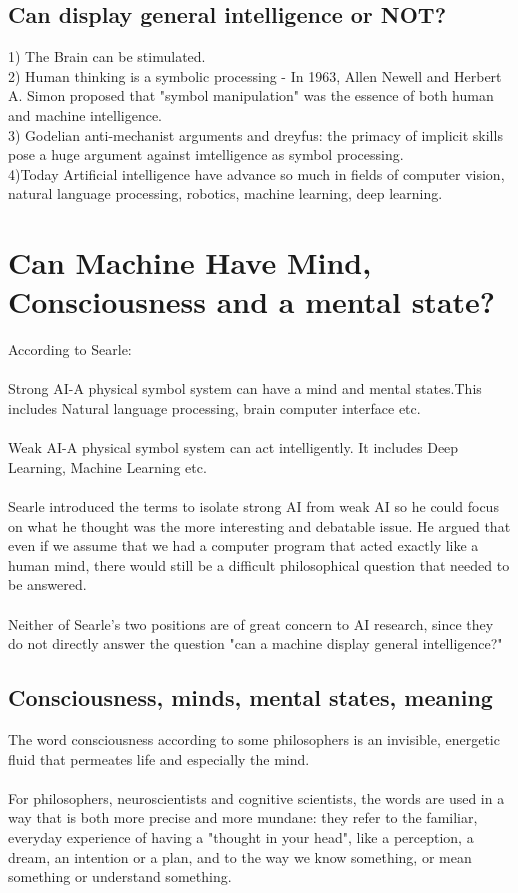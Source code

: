 \documentclass[a4paper]{article}
\begin{document}
    \subsection{Can display general intelligence or NOT?}
    1) The Brain can be  stimulated.\\
    2) Human thinking is a symbolic processing - In 1963, Allen Newell and Herbert A. Simon proposed that "symbol manipulation" was the essence of both human and machine intelligence.\\
    3) Godelian anti-mechanist arguments  and dreyfus: the primacy of implicit skills pose a huge argument against imtelligence as symbol processing.\\
    4)Today Artificial intelligence have advance so much in fields of computer vision, natural language processing, robotics, machine learning, deep learning.
    
    \section{Can Machine Have Mind, Consciousness and a mental state?}
    According to Searle:\\\\
    Strong AI-A physical symbol system can have a mind and mental states.This includes Natural language processing, brain computer interface etc.\\\\
    Weak AI-A physical symbol system can act intelligently. It includes Deep Learning, Machine Learning etc.\\
    \\
    Searle introduced the terms to isolate strong AI from weak AI so he could focus on what he thought was the more interesting and debatable issue. He argued that even if we assume that we had a computer program that acted exactly like a human mind, there would still be a difficult philosophical question that needed to be answered.\\
    \\Neither of Searle's two positions are of great concern to AI research, since they do not directly answer the question "can a machine display general intelligence?"
    \subsection{Consciousness, minds, mental states, meaning}
    The word consciousness according to some philosophers is an invisible, energetic fluid that permeates life and especially the mind.\\\\
    For philosophers, neuroscientists and cognitive scientists, the words are used in a way that is both more precise and more mundane: they refer to the familiar, everyday experience of having a "thought in your head", like a perception, a dream, an intention or a plan, and to the way we know something, or mean something or understand something.
    
\end{document}
